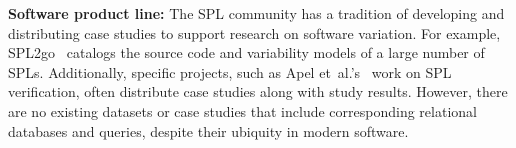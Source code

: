 \begin{comment}
--------------------------------------------------------------------------------------
* uses views to choose the subset of global schema per variant
* view integration or view merging ~\cite{sp94tkde, parsons02jmis, bln86acmcs}:
focuses on consistency checking, covering different, incomplete, and 
overlapping aspects in local view to retrieve one valid global view or sch.
* or view tailoring~\cite{bqr07cmer} aims at generating and composing views to
tailor the data of an underlying database schema for a given context. 
* View-based approaches~\cite{bqr07cmer} generate views on top of the global schema that emulate a schema variant for the client, which may be seen as an annotative approach. Thus, the global schema is still part of every DB schema vari- ant, the approach inherits the problems of the global schema. Unfortunately, the vari- ant?s schema complexity does even increase, because the additional schema elements for the view, emulating the variant, have to be included as well. Furthermore, there is additional effort to generate views when modeling the DB schema. This approach has benefits in data integrity, because the views emulating the schema variants can contain additional integrity constraints, which cannot be included into the global schema. Thus, the expressiveness of the model is also better than in the global schema approach



\end{comment}


\textbf{Software product line:}
The SPL community has a tradition of developing and distributing case studies
to support research on software variation. For example, SPL2go~\cite{SPL2go}
catalogs the source code and variability models of a large number of SPLs.
Additionally, specific projects, such as Apel
et~al.'s~\cite{apel2013strategies} work on SPL verification, often distribute
case studies along with study results.
%
However, there are no existing datasets or case studies that include
corresponding relational databases and queries, despite their ubiquity in modern software.



